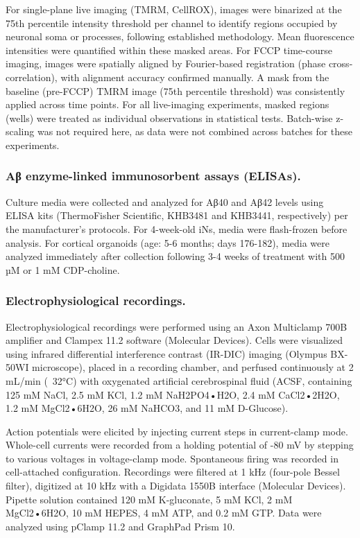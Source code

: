 For single-plane live imaging (TMRM, CellROX), images were binarized at the 75th percentile intensity threshold per channel to identify regions occupied by neuronal soma or processes, following established methodology\supercite{Esteras2020-md}. Mean fluorescence intensities were quantified within these masked areas. For FCCP time-course imaging, images were spatially aligned by Fourier-based registration (phase cross-correlation), with alignment accuracy confirmed manually. A mask from the baseline (pre-FCCP) TMRM image (75th percentile threshold) was consistently applied across time points. For all live-imaging experiments, masked regions (wells) were treated as individual observations in statistical tests. Batch-wise z-scaling was not required here, as data were not combined across batches for these experiments.

\subsubsection{Aβ enzyme-linked immunosorbent assays (ELISAs).}
Culture media were collected and analyzed for Aβ40 and Aβ42 levels using ELISA kits (ThermoFisher Scientific, KHB3481 and KHB3441, respectively) per the manufacturer's protocols. For 4-week-old iNs, media were flash-frozen before analysis. For cortical organoids (age: 5-6 months; days 176-182), media were analyzed immediately after collection following 3-4 weeks of treatment with 500 µM or 1 mM CDP-choline. 

\subsubsection{Electrophysiological recordings.}
Electrophysiological recordings were performed using an Axon Multiclamp 700B amplifier and Clampex 11.2 software (Molecular Devices). Cells were visualized using infrared differential interference contrast (IR-DIC) imaging (Olympus BX-50WI microscope), placed in a recording chamber, and perfused continuously at 2 mL/min (~32°C) with oxygenated artificial cerebrospinal fluid (ACSF, containing 125 mM NaCl, 2.5 mM KCl, 1.2 mM NaH2PO4•H2O, 2.4 mM CaCl2•2H2O, 1.2 mM MgCl2•6H2O, 26 mM NaHCO3, and 11 mM D-Glucose).

Action potentials were elicited by injecting current steps in current-clamp mode. Whole-cell currents were recorded from a holding potential of -80 mV by stepping to various voltages in voltage-clamp mode. Spontaneous firing was recorded in cell-attached configuration. Recordings were filtered at 1 kHz (four-pole Bessel filter), digitized at 10 kHz with a Digidata 1550B interface (Molecular Devices). Pipette solution contained 120 mM K-gluconate, 5 mM KCl, 2 mM MgCl2•6H2O, 10 mM HEPES, 4 mM ATP, and 0.2 mM GTP. Data were analyzed using pClamp 11.2 and GraphPad Prism 10.

